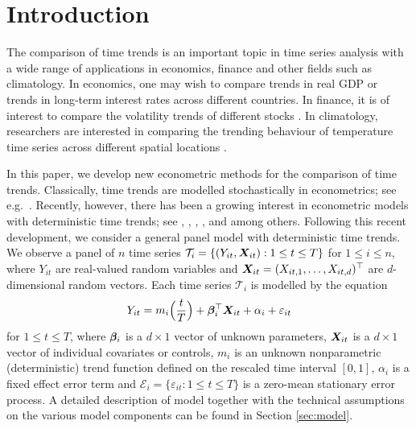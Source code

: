 \documentclass[a4paper,12pt]{article}
\makeatletter
\renewcommand{\eqref}[1]{\tagform@{\ref{#1}}}
\makeatother
\begin{document}
\vspace{-0.25cm}

\allowdisplaybreaks[1]

%


\section{Introduction}\label{sec:intro}


The comparison of time trends is an important topic in time series analysis with a wide range of applications in economics, finance and other fields such as climatology. In economics, one may wish to compare trends in real GDP \citep[][]{Grier1989} or trends in long-term interest rates \citep[][]{Christiansen1997} across different countries. In finance, it is of interest to compare the volatility trends of different stocks \citep[][]{Nyblom2000}. In climatology, researchers are interested in comparing the trending behaviour of temperature time series across different spatial locations \citep[][]{KarolyWu2005}. 


In this paper, we develop new econometric methods for the comparison of time trends. Classically, time trends are modelled stochastically in econometrics; see e.g.\ \cite{Stock1988}. Recently, however, there has been a growing interest in econometric models with deterministic time trends; see \cite{Cai2007}, \cite{Atak2011}, \cite{Robinson2012}, \cite{ChenGaoLi2012}, \cite{Zhang2012} and \cite{Hidalgo2014} among others. Following this recent development, we consider a general panel model with deterministic time trends. We observe a panel of $n$ time series $\mathcal{T}_i = \{ (Y_{it},\boldsymbol{X}_{it}): 1 \le t \le T \}$ for $1 \le i \le n$, where $Y_{it}$ are real-valued random variables and $\boldsymbol{X}_{it} = (X_{it,1},\ldots, X_{it, d})^\top$ are $d$-dimensional random vectors. Each time series $\mathcal{T}_i$ is modelled by the equation
\begin{equation}\label{eq:model}
Y_{it} = m_i \Big( \frac{t}{T} \Big) + \bm{\beta}_i^\top \boldsymbol{X}_{it} + \alpha_i + \varepsilon_{it}
\end{equation}
for $1 \le t \le T$, where $\bm{\beta}_i$ is a $d \times 1$ vector of unknown parameters, $\boldsymbol{X}_{it}$ is a $d\times 1$ vector of individual covariates or controls, $m_i$ is an unknown nonparametric (deterministic) trend function defined on the rescaled time interval $[0,1]$, $\alpha_i$ is a fixed effect error term and $\mathcal{E}_i = \{ \varepsilon_{it}: 1 \le t \le T \}$ is a zero-mean stationary error process. A detailed description of model \eqref{eq:model} together with the technical assumptions on the various model components can be found in Section \ref{sec:model}.
\end{document}
